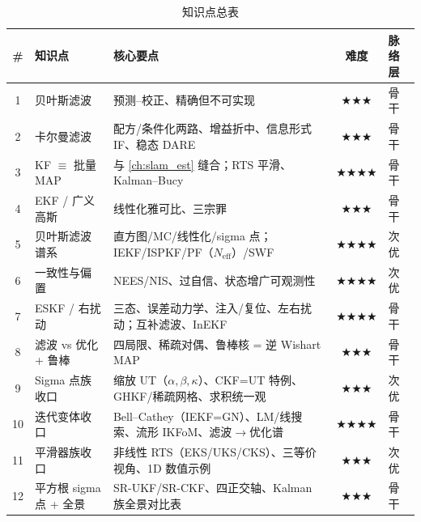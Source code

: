 \begin{table}[H]\centering\small
\caption{知识点总表}
\begin{tabular}{cllcl}
\toprule
\# & 知识点 & 核心要点 & 难度 & 脉络层 \\
\midrule
1 & 贝叶斯滤波 & 预测–校正、精确但不可实现 & $\bigstar\bigstar\bigstar$ & 骨干 \\
2 & 卡尔曼滤波 & 配方/条件化两路、增益折中、信息形式 IF、稳态 DARE & $\bigstar\bigstar\bigstar$ & 骨干 \\
3 & KF $\equiv$ 批量 MAP & 与 \cref{ch:slam_est} 缝合；RTS 平滑、Kalman--Bucy & $\bigstar\bigstar\bigstar\bigstar$ & 骨干 \\
4 & EKF / 广义高斯 & 线性化雅可比、三宗罪 & $\bigstar\bigstar\bigstar$ & 骨干 \\
5 & 贝叶斯滤波谱系 & 直方图/MC/线性化/sigma 点；IEKF/ISPKF/PF（$N_{\text{eff}}$）/SWF & $\bigstar\bigstar\bigstar\bigstar$ & 次优 \\
6 & 一致性与偏置 & NEES/NIS、过自信、状态增广可观测性 & $\bigstar\bigstar\bigstar\bigstar$ & 次优 \\
7 & ESKF / 右扰动 & 三态、误差动力学、注入/复位、左右扰动；互补滤波、InEKF & $\bigstar\bigstar\bigstar\bigstar$ & 骨干 \\
8 & 滤波 vs 优化 + 鲁棒 & 四局限、稀疏对偶、鲁棒核 = 逆 Wishart MAP & $\bigstar\bigstar\bigstar$ & 骨干 \\
9 & Sigma 点族收口 & 缩放 UT（$\alpha,\beta,\kappa$）、CKF=UT 特例、GHKF/稀疏网格、求积统一观 & $\bigstar\bigstar\bigstar$ & 次优 \\
10 & 迭代变体收口 & Bell--Cathey（IEKF=GN）、LM/线搜索、流形 IKFoM、滤波$\to$优化谱 & $\bigstar\bigstar\bigstar\bigstar$ & 骨干 \\
11 & 平滑器族收口 & 非线性 RTS（EKS/UKS/CKS）、三等价视角、1D 数值示例 & $\bigstar\bigstar\bigstar$ & 次优 \\
12 & 平方根 sigma 点 + 全景 & SR-UKF/SR-CKF、四正交轴、Kalman 族全景对比表 & $\bigstar\bigstar\bigstar$ & 骨干 \\
\bottomrule
\end{tabular}
\end{table}


